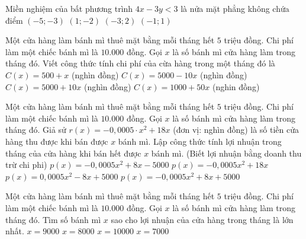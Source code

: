 \begin{ex}%
	Miền nghiệm của bất phương trình $4x-3y<3$ là nửa mặt phẳng không chứa điểm
	\choice
	{$(-5;-3)$}
	{\True $(1;-2)$}
	{$(-3;2)$}
	{$(-1;1)$}
\end{ex}
\begin{ex}%
	Một cửa hàng làm bánh mì thuê mặt bằng mỗi tháng hết $5$ triệu đồng. Chi phí làm một chiếc bánh mì là $10.000$ đồng. Gọi $x$ là số bánh mì cửa hàng làm trong tháng đó.
	Viết công thức tính chi phí của cừa hàng trong một tháng đó là 
	\choice
	{$C(x)=500+x$ (nghìn đồng)}
	{$C(x)=5000-10x$ (nghìn đồng)}
	{\True $C(x)=5000+10x$ (nghìn đồng)}
	{$C(x)=1000+50x$ (nghin đồng)}
\end{ex}
\begin{ex}%
	Một cửa hàng làm bánh mì thuê mặt bằng mỗi tháng hết $5$ triệu đồng. Chi phí làm một chiếc bánh mì là $10.000$ đồng. Gọi $x$ là số bánh mì cửa hàng làm trong tháng đó.
	Giả sử $r(x)=-0{,}0005\cdot x^2+18x$ (đơn vị: nghìn đồng) là số tiền cửa hàng thu được khi bán được $x$ bánh mì. Lập công thức tính lợi nhuận trong tháng của cửa hàng khi bán hết được $x$ bánh mì. (Biết lợi nhuận bằng doanh thu trừ chi phi)
	\choice
	{\True $p(x)=-0{,}0005 x^2+8x-5000$}
	{$p(x)=-0{,}0005 x^2+18x$}
	{$p(x)=0{,}0005 x^2-8x+5000$}
	{$p(x)=-0{,}0005 x^2+8x+5000$}
\end{ex}
\begin{ex}%
	Một cửa hàng làm bánh mì thuê mặt bằng mỗi tháng hết $5$ triệu đồng. Chi phí làm một chiếc bánh mì là $10.000$ đồng. Gọi $x$ là số bánh mì cửa hàng làm trong tháng đó.
	Tìm số bánh mì $x$ sao cho lợi nhuận của cửa hàng trong tháng là lớn nhất.
	\choice
	{$x=9000$}
	{\True $x=8000$}
	{$x=10000$}
	{$x=7000$}
\end{ex}



